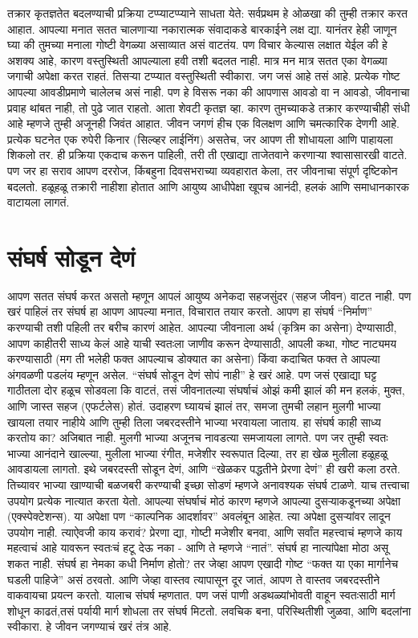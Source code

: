 तक्रार कृतज्ञतेत बदलण्याची प्रक्रिया टप्प्याटप्प्याने साधता येते:
सर्वप्रथम हे ओळखा की तुम्ही तक्रार करत आहात. आपल्या मनात सतत चालणाऱ्या नकारात्मक संवादाकडे बारकाईने लक्ष द्या.
यानंतर हेही जाणून घ्या की तुमच्या मनाला गोष्टी वेगळ्या असाव्यात असं वाटतंय. पण विचार केल्यास लक्षात येईल की हे अशक्य आहे, कारण वस्तुस्थिती आपल्याला हवी तशी बदलत नाही. मात्र मन मात्र सतत एका वेगळ्या जगाची अपेक्षा करत राहतं.
तिसऱ्या टप्प्यात वस्तुस्थिती स्वीकारा. जग जसं आहे तसं आहे. प्रत्येक गोष्ट आपल्या आवडीप्रमाणे चालेलच असं नाही. पण हे विसरू नका की आपणास आवडो वा न आवडो, जीवनाचा प्रवाह थांबत नाही, तो पुढे जात राहतो.
आता शेवटी कृतज्ञ व्हा. कारण तुमच्याकडे तक्रार करण्याचीही संधी आहे म्हणजे तुम्ही अजूनही जिवंत आहात. जीवन जगणं हीच एक विलक्षण आणि चमत्कारिक देणगी आहे. प्रत्येक घटनेत एक रुपेरी किनार (सिल्व्हर लाईनिंग) असतेच, जर आपण ती शोधायला आणि पाहायला शिकलो तर.
ही प्रक्रिया एकदाच करून पाहिली, तरी ती एखाद्या ताजेतवाने करणाऱ्या श्वासासारखी वाटते. पण जर हा सराव आपण दररोज, किंबहुना दिवसभराच्या व्यवहारात केला, तर जीवनाचा संपूर्ण दृष्टिकोन बदलतो. हळूहळू तक्रारी नाहीशा होतात आणि आयुष्य आधीपेक्षा खूपच आनंदी, हलकं आणि समाधानकारक वाटायला लागतं.
 \chapter{संघर्ष सोडून देणं}
आपण सतत संघर्ष करत असतो म्हणून आपलं आयुष्य अनेकदा सहजसुंदर (सहज जीवन) वाटत नाही. पण खरं पाहिलं तर संघर्ष हा आपण आपल्या मनात, विचारात तयार करतो.
आपण हा संघर्ष “निर्माण” करण्याची तशी पहिली तर बरीच कारणं आहेत. आपल्या जीवनाला अर्थ (कृत्रिम का असेना) देण्यासाठी, आपण काहीतरी साध्य केलं आहे याची स्वतःला जाणीव करून देण्यासाठी, आपली कथा, गोष्ट नाट्यमय करण्यासाठी (मग ती भलेही फक्त आपल्याच डोक्यात का असेना) किंवा कदाचित फक्त ते आपल्या अंगवळणी पडलंय म्हणून असेल.
“संघर्ष सोडून देणं सोपं नाही” हे खरं आहे. पण जसं एखाद्या घट्ट गाठीतला दोर हळूच सोडवला कि वाटतं, तसं जीवनातल्या संघर्षाचं ओझं कमी झालं की मन हलकं, मुक्त, आणि जास्त सहज (एफर्टलेस) होतं.
उदाहरण घ्यायचं झालं तर, समजा तुमची लहान मुलगी भाज्या खायला तयार नाहीये आणि तुम्ही तिला जबरदस्तीने भाज्या भरवायला जाताय. हा संघर्ष काही साध्य करतोय का? अजिबात नाही. मुलगी भाज्या अजूनच नावडत्या समजायला लागते. पण जर तुम्ही स्वतः भाज्या आनंदाने खाल्ल्या, मुलीला भाज्या रंगीत, मजेशीर स्वरूपात दिल्या, तर हा खेळ मुलीला हळूहळू आवडायला लागतो. इथे जबरदस्ती सोडून देणं, आणि “खेळकर पद्धतीने प्रेरणा देणं”  ही खरी कला ठरते. तिच्यावर भाज्या खाण्याची बळजबरी करण्याची इच्छा सोडणं म्हणजे अनावश्यक संघर्ष टाळणे.
याच तत्त्वाचा उपयोग प्रत्येक नात्यात करता येतो. आपल्या संघर्षाचं मोठं कारण म्हणजे आपल्या दुसऱ्याकडूनच्या अपेक्षा (एक्स्पेक्टेशन्स). या अपेक्षा पण “काल्पनिक आदर्शावर” अवलंबून आहेत. त्या अपेक्षा दुसऱ्यांवर लादून उपयोग नाही. त्याऐवजी काय करावं? प्रेरणा द्या, गोष्टी मजेशीर बनवा, आणि सर्वांत महत्त्वाचं म्हणजे काय महत्वाचं आहे यावरून स्वतःचं हटू देऊ नका - आणि ते म्हणजे “नातं”. संघर्ष हा नात्यांपेक्षा मोठा असू शकत नाही.
संघर्ष हा नेमका कधी निर्माण होतो? तर जेव्हा आपण एखादी गोष्ट “फक्त या एका मार्गानेच घडली पाहिजे” असं ठरवतो. आणि जेव्हा वास्तव त्यापासून दूर जातं, आपण ते वास्तव जबरदस्तीने वाकवायचा प्रयत्न करतो. यालाच संघर्ष म्हणतात. पण जसं पाणी अडथळ्यांभोवती वाहून स्वतःसाठी मार्ग शोधून काढतं,तसं पर्यायी मार्ग शोधला तर संघर्ष मिटतो. लवचिक बना, परिस्थितीशी जुळवा, आणि बदलांना स्वीकारा. हे जीवन जगण्याचं खरं तंत्र आहे.
